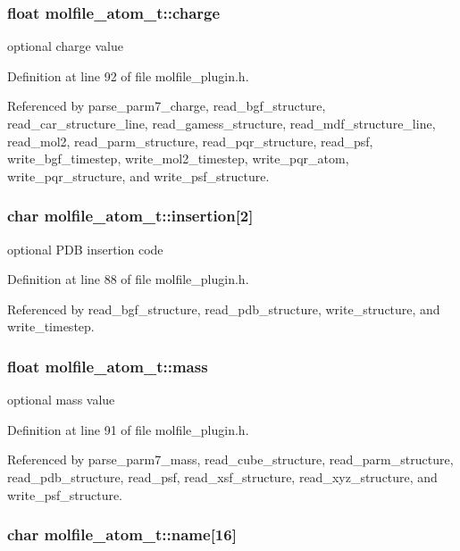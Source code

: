 \subsubsection{\setlength{\rightskip}{0pt plus 5cm}float molfile\_\-atom\_\-t::charge}\label{structmolfile__atom__t_m11}


optional charge value 

Definition at line 92 of file molfile\_\-plugin.h.

Referenced by parse\_\-parm7\_\-charge, read\_\-bgf\_\-structure, read\_\-car\_\-structure\_\-line, read\_\-gamess\_\-structure, read\_\-mdf\_\-structure\_\-line, read\_\-mol2, read\_\-parm\_\-structure, read\_\-pqr\_\-structure, read\_\-psf, write\_\-bgf\_\-timestep, write\_\-mol2\_\-timestep, write\_\-pqr\_\-atom, write\_\-pqr\_\-structure, and write\_\-psf\_\-structure.
\subsubsection{\setlength{\rightskip}{0pt plus 5cm}char molfile\_\-atom\_\-t::insertion[2]}\label{structmolfile__atom__t_m7}


optional PDB insertion code 

Definition at line 88 of file molfile\_\-plugin.h.

Referenced by read\_\-bgf\_\-structure, read\_\-pdb\_\-structure, write\_\-structure, and write\_\-timestep.
\subsubsection{\setlength{\rightskip}{0pt plus 5cm}float molfile\_\-atom\_\-t::mass}\label{structmolfile__atom__t_m10}


optional mass value 

Definition at line 91 of file molfile\_\-plugin.h.

Referenced by parse\_\-parm7\_\-mass, read\_\-cube\_\-structure, read\_\-parm\_\-structure, read\_\-pdb\_\-structure, read\_\-psf, read\_\-xsf\_\-structure, read\_\-xyz\_\-structure, and write\_\-psf\_\-structure.
\subsubsection{\setlength{\rightskip}{0pt plus 5cm}char molfile\_\-atom\_\-t::name[16]}\label{structmolfile__atom__t_m0}


